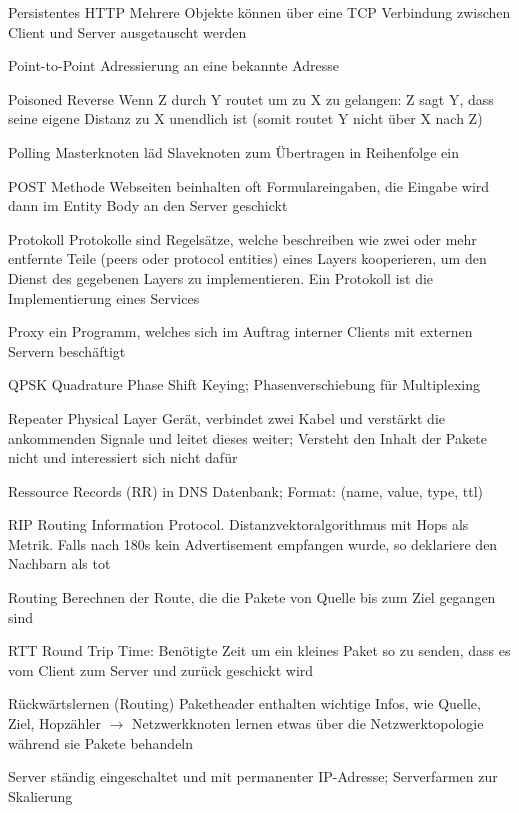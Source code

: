 \documentclass[10pt,landscape]{article}
\begin{document}
\begin{multicols}{3}
\begin{description*}
        \item[Persistentes HTTP ] Mehrere Objekte können über eine TCP Verbindung zwischen Client und Server ausgetauscht werden
        \item[Point-to-Point] Adressierung an eine bekannte Adresse
        \item[Poisoned Reverse] Wenn Z durch Y routet um zu X zu gelangen: Z sagt Y, dass seine eigene Distanz zu X unendlich ist (somit routet Y nicht über X nach Z)
        \item[Polling] Masterknoten läd Slaveknoten zum Übertragen in Reihenfolge ein
        \item[POST Methode] Webseiten beinhalten oft Formulareingaben, die Eingabe wird dann im Entity Body an den Server geschickt
        \item[Protokoll] Protokolle sind Regelsätze, welche beschreiben wie zwei oder mehr entfernte Teile (peers oder protocol entities) eines Layers kooperieren, um den Dienst des gegebenen Layers zu implementieren. Ein Protokoll ist die Implementierung eines Services
        \item[Proxy] ein Programm, welches sich im Auftrag interner Clients mit externen Servern beschäftigt
        \item[QPSK] Quadrature Phase Shift Keying; Phasenverschiebung für Multiplexing
        \item[Repeater] Physical Layer Gerät, verbindet zwei Kabel und verstärkt die ankommenden Signale und leitet dieses weiter; Versteht den Inhalt der Pakete nicht und interessiert sich nicht dafür
        \item[Ressource Records (RR)] in DNS Datenbank; Format: (name, value, type, ttl)
        \item[RIP] Routing Information Protocol. Distanzvektoralgorithmus mit Hops als Metrik. Falls nach 180s kein Advertisement empfangen wurde, so deklariere den Nachbarn als tot
        \item[Routing] Berechnen der Route, die die Pakete von Quelle bis zum Ziel gegangen sind
        \item[RTT] Round Trip Time: Benötigte Zeit um ein kleines Paket so zu senden, dass es vom Client zum Server und zurück geschickt wird
        \item[Rückwärtslernen (Routing)] Paketheader enthalten wichtige Infos, wie Quelle, Ziel, Hopzähler $\rightarrow$ Netzwerkknoten lernen etwas über die Netzwerktopologie während sie Pakete behandeln
        \item[Server] ständig eingeschaltet und mit permanenter IP-Adresse; Serverfarmen zur Skalierung

\end{description*}
\end{multicols}
\end{document}

